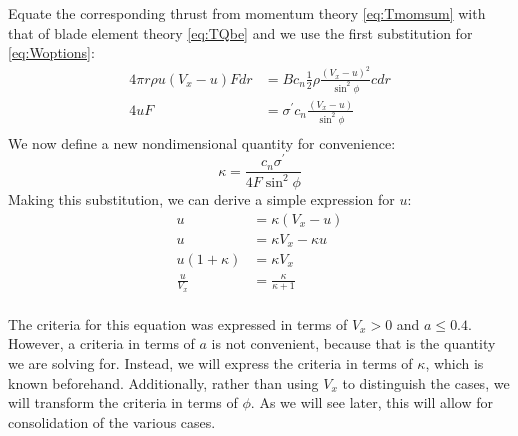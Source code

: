 \documentclass{article}
\begin{document}
\begin{itemize}
Equate the corresponding thrust from momentum theory \cref{eq:Tmomsum} with that of blade element theory \cref{eq:TQbe} and we use the first substitution for \cref{eq:Woptions}:
\begin{equation}
\begin{aligned}
    4 \pi r \rho u (V_x - u) F dr &= B c_n \frac{1}{2}\rho \frac{(V_x - u)^2}{\sin^2\phi} c dr\\
    4 u F &= \sigma^\prime c_n \frac{(V_x - u)}{\sin^2\phi} \\
\end{aligned}
\end{equation}
We now define a new nondimensional quantity for convenience:
\begin{equation}
    \kappa = \frac{c_n \sigma^\prime}{4 F \sin^2 \phi}
\end{equation}
Making this substitution, we can derive a simple expression for $u$:
\begin{equation}
    \begin{aligned}
        u &= \kappa (V_x - u)\\
        u &= \kappa V_x - \kappa u\\
        u (1 + \kappa) &= \kappa V_x\\
        \frac{u}{V_x} &= \frac{\kappa}{\kappa + 1}\\
    \end{aligned}
\end{equation}

The criteria for this equation was expressed in terms of $V_x > 0$ and $a \le 0.4$.  However, a criteria in terms of $a$ is not convenient, because that is the quantity we are solving for.  Instead, we will express the criteria in terms of $\kappa$, which is known beforehand.  Additionally, rather than using $V_x$ to distinguish the cases, we will transform the criteria in terms of $\phi$.  As we will see later, this will allow for consolidation of the various cases.


\end{itemize}
\end{document}
